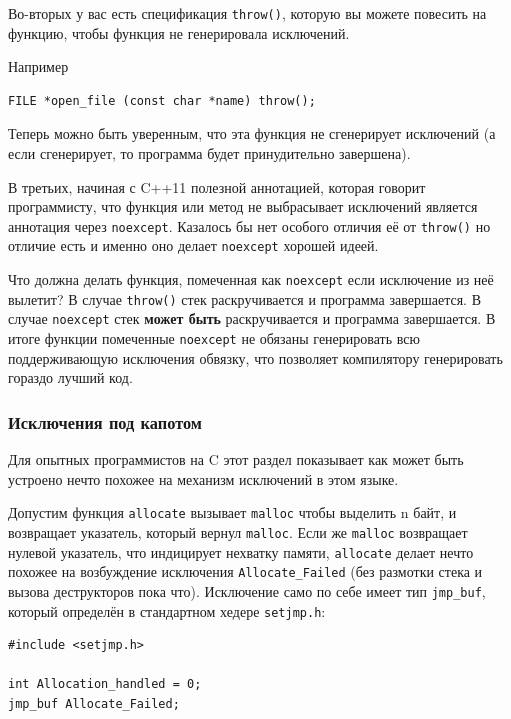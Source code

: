 \documentclass[a4paper,12pt,oneside]{article}
\begin{document}
Во-вторых у вас есть спецификация \lstinline!throw()!, которую вы можете повесить на функцию, чтобы функция не генерировала исключений.

Например

\begin{lstlisting}
FILE *open_file (const char *name) throw();
\end{lstlisting}

Теперь можно быть уверенным, что эта функция не сгенерирует исключений (а если сгенерирует, то программа будет принудительно завершена).

В третьих, начиная с C++11 полезной аннотацией, которая говорит программисту, что функция или метод не выбрасывает исключений является аннотация через \lstinline!noexcept!. Казалось бы нет особого отличия её от \lstinline!throw()! но отличие есть и именно оно делает \lstinline!noexcept! хорошей идеей.

Что должна делать функция, помеченная как \lstinline!noexcept! если исключение из неё вылетит? В случае \lstinline!throw()! стек раскручивается и программа завершается. В случае \lstinline!noexcept! стек \textbf{может быть} раскручивается и программа завершается. В итоге функции помеченные \lstinline!noexcept! не обязаны генерировать всю поддерживающую исключения обвязку, что позволяет компилятору генерировать гораздо лучший код.

\subsubsection{Исключения под капотом}\label{subsub:deepdiveexc}

Для опытных программистов на C этот раздел показывает как может быть устроено нечто похожее на механизм исключений в этом языке.

Допустим функция \lstinline!allocate! вызывает \lstinline!malloc! чтобы выделить n байт, и возвращает указатель, который вернул \lstinline!malloc!. Если же \lstinline!malloc! возвращает нулевой указатель, что индицирует нехватку памяти, \lstinline!allocate! делает нечто похожее на возбуждение исключения \lstinline!Allocate_Failed! (без размотки стека и вызова деструкторов пока что). Исключение само по себе имеет тип \lstinline!jmp_buf!, который определён в стандартном хедере \lstinline!setjmp.h!:


\begin{lstlisting}
#include <setjmp.h>

int Allocation_handled = 0;
jmp_buf Allocate_Failed;
\end{lstlisting}
\end{document}
